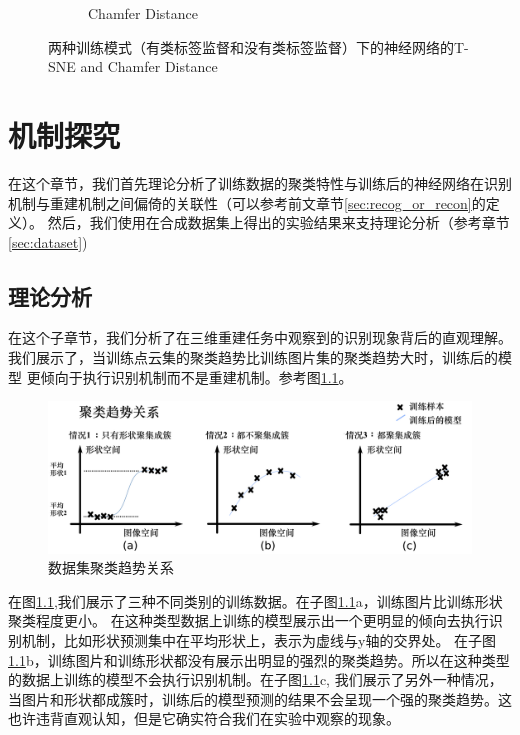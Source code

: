 \documentclass[bachelor, nocolorlinks, printoneside]{seuthesis} %
\begin{document}
\begin{Main}
\begin{figure}
\begin{subfigure}[t]{0.2\linewidth}
    \caption{Chamfer Distance}\label{fig:T-SNE3}
  \end{subfigure}
  \caption{\small 两种训练模式（有类标签监督和没有类标签监督）下的神经网络的T-SNE and Chamfer Distance }\label{fig:T-SNE}
  \label{fig:TSNE-Chamfer}
\end{figure}


\chapter{机制探究}
在这个章节，我们首先理论分析了训练数据的聚类特性与训练后的神经网络在识别机制与重建机制之间偏倚的关联性（可以参考前文章节\ref{sec:recog_or_recon}的定义）。
然后，我们使用在合成数据集上得出的实验结果来支持理论分析（参考章节\ref{sec:dataset})
\section{理论分析}\label{sec:thm}
在这个子章节，我们分析了在三维重建任务中观察到的识别现象背后的直观理解。我们展示了，当训练点云集的聚类趋势比训练图片集的聚类趋势大时，训练后的模型
更倾向于执行识别机制而不是重建机制。参考图\ref{fig:clustering_tendency}。

\begin{figure}
    \centering
    \includegraphics[width=.95\textwidth]{figs/drawing.png}
    \caption{\small 数据集聚类趋势关系}
    \label{fig:clustering_tendency}
\end{figure}

在图\ref{fig:clustering_tendency},我们展示了三种不同类别的训练数据。在子图\ref{fig:clustering_tendency}a，训练图片比训练形状聚类程度更小。
在这种类型数据上训练的模型展示出一个更明显的倾向去执行识别机制，比如形状预测集中在平均形状上，表示为虚线与y轴的交界处。
在子图\ref{fig:clustering_tendency}b，训练图片和训练形状都没有展示出明显的强烈的聚类趋势。所以在这种类型的数据上训练的模型不会执行识别机制。在子图\ref{fig:clustering_tendency}c,
我们展示了另外一种情况，当图片和形状都成簇时，训练后的模型预测的结果不会呈现一个强的聚类趋势。这也许违背直观认知，但是它确实符合我们在实验中观察的现象。


\end{Main}
\end{document}
